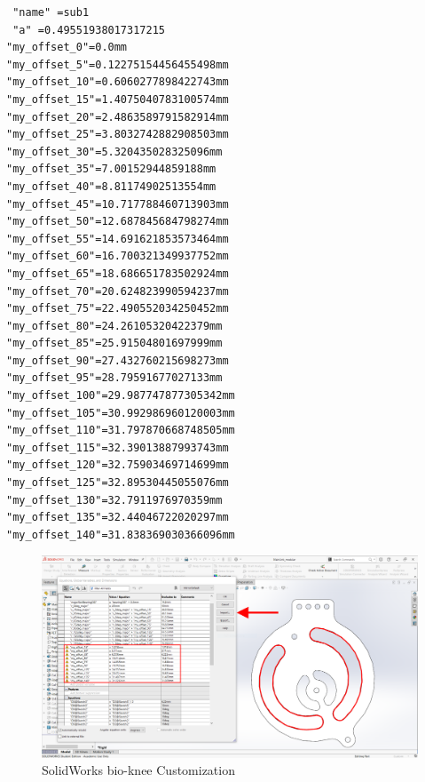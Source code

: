\begin{lstlisting}
 "name" =sub1
 "a" =0.49551938017317215
"my_offset_0"=0.0mm 
"my_offset_5"=0.12275154456455498mm 
"my_offset_10"=0.6060277898422743mm 
"my_offset_15"=1.4075040783100574mm 
"my_offset_20"=2.4863589791582914mm 
"my_offset_25"=3.8032742882908503mm 
"my_offset_30"=5.320435028325096mm 
"my_offset_35"=7.00152944859188mm 
"my_offset_40"=8.81174902513554mm 
"my_offset_45"=10.717788460713903mm 
"my_offset_50"=12.687845684798274mm 
"my_offset_55"=14.691621853573464mm 
"my_offset_60"=16.700321349937752mm 
"my_offset_65"=18.686651783502924mm 
"my_offset_70"=20.624823990594237mm 
"my_offset_75"=22.490552034250452mm 
"my_offset_80"=24.26105320422379mm 
"my_offset_85"=25.91504801697999mm 
"my_offset_90"=27.432760215698273mm 
"my_offset_95"=28.79591677027133mm 
"my_offset_100"=29.987747877305342mm 
"my_offset_105"=30.992986960120003mm 
"my_offset_110"=31.797870668748505mm 
"my_offset_115"=32.39013887993743mm 
"my_offset_120"=32.75903469714699mm 
"my_offset_125"=32.89530445055076mm 
"my_offset_130"=32.7911976970359mm 
"my_offset_135"=32.44046722020297mm 
"my_offset_140"=31.838369030366096mm 
\end{lstlisting}


\begin{figure}[hbt!]
    \centering
    \includegraphics[width=\textwidth]{images/appendix/solidworks_customization.png}
    \caption{SolidWorks bio-knee Customization}
    \label{fig:SolidWorksbiokneeCustomization}
\end{figure}



